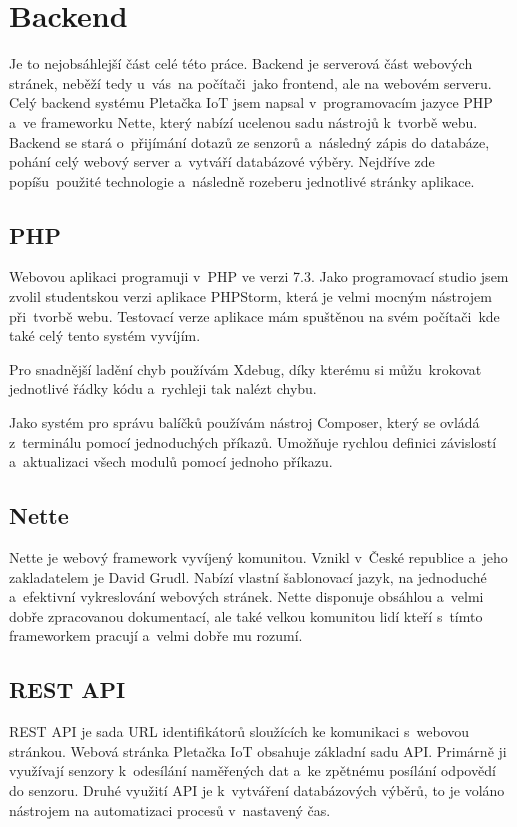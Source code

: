 \section{Backend}
Je to nejobsáhlejší část celé této práce. 
Backend je serverová část webových stránek, neběží tedy u~vás~na počítači~jako frontend, ale na webovém serveru.   
Celý backend systému Pletačka IoT jsem napsal v~programovacím jazyce PHP a~ve frameworku Nette\cite{NETTE}, který nabízí ucelenou sadu nástrojů k~tvorbě webu.
Backend se stará o~přijímání dotazů ze senzorů a~následný zápis do databáze, pohání celý webový server a~vytváří databázové výběry.
Nejdříve zde popíšu~použité technologie a~následně rozeberu jednotlivé stránky aplikace.

\subsection{PHP}
Webovou aplikaci programuji v~PHP ve verzi 7.3. Jako programovací studio jsem zvolil studentskou verzi aplikace PHPStorm, která je velmi mocným nástrojem při~tvorbě webu.
Testovací verze aplikace mám spuštěnou na svém počítači~kde také celý tento systém vyvíjím. 

Pro snadnější ladění chyb používám Xdebug, díky kterému si můžu~krokovat jednotlivé řádky kódu a~rychleji tak nalézt chybu.

Jako systém pro správu balíčků používám nástroj Composer, který se ovládá z~terminálu pomocí jednoduchých příkazů.
Umožňuje rychlou definici závislostí a~aktualizaci všech modulů pomocí jednoho příkazu.


\subsection{Nette}
Nette je webový framework vyvíjený komunitou. Vznikl v~České republice a~jeho zakladatelem je David Grudl. 
Nabízí vlastní šablonovací jazyk, na jednoduché a~efektivní vykreslování webových stránek. 
Nette disponuje obsáhlou a~velmi dobře zpracovanou dokumentací, ale také velkou komunitou lidí kteří s~tímto frameworkem pracují a~velmi dobře mu rozumí. 


\subsection{REST API}

REST API je sada URL identifikátorů sloužících ke komunikaci s~webovou stránkou.
Webová stránka Pletačka IoT obsahuje základní sadu API.
Primárně ji využívají senzory k~odesílání naměřených dat a~ke zpětnému posílání odpovědí do senzoru.
Druhé využití API je k~vytváření databázových výběrů, to je voláno nástrojem na automatizaci procesů v~nastavený čas.

